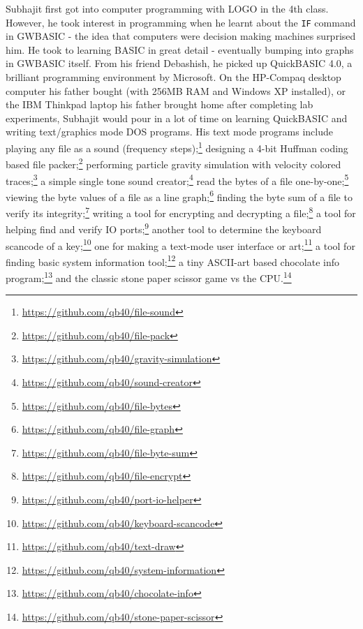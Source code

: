 Subhajit first got into computer programming with LOGO in the 4th class. However, he took interest in programming when he learnt about the \verb|IF| command in GWBASIC - the idea that computers were decision making machines surprised him. He took to learning BASIC in great detail - eventually bumping into graphs in GWBASIC itself. From his friend Debashish, he picked up QuickBASIC 4.0, a brilliant programming environment by Microsoft. On the HP-Compaq desktop computer his father bought (with 256MB RAM and Windows XP installed), or the IBM Thinkpad laptop his father brought home after completing lab experiments, Subhajit would pour in a lot of time on learning QuickBASIC and writing text/graphics mode DOS programs. His text mode programs include playing any file as a sound (frequency steps);\footnote{\url{https://github.com/qb40/file-sound}} designing a 4-bit Huffman coding based file packer;\footnote{\url{https://github.com/qb40/file-pack}} performing particle gravity simulation with velocity colored traces;\footnote{\url{https://github.com/qb40/gravity-simulation}} a simple single tone sound creator;\footnote{\url{https://github.com/qb40/sound-creator}} read the bytes of a file one-by-one;\footnote{\url{https://github.com/qb40/file-bytes}} viewing the byte values of a file as a line graph;\footnote{\url{https://github.com/qb40/file-graph}} finding the byte sum of a file to verify its integrity;\footnote{\url{https://github.com/qb40/file-byte-sum}} writing a tool for encrypting and decrypting a file;\footnote{\url{https://github.com/qb40/file-encrypt}} a tool for helping find and verify IO ports;\footnote{\url{https://github.com/qb40/port-io-helper}} another tool to determine the keyboard scancode of a key;\footnote{\url{https://github.com/qb40/keyboard-scancode}} one for making a text-mode user interface or art;\footnote{\url{https://github.com/qb40/text-draw}} a tool for finding basic system information tool;\footnote{\url{https://github.com/qb40/system-information}} a tiny ASCII-art based chocolate info program;\footnote{\url{https://github.com/qb40/chocolate-info}} and the classic stone paper scissor game vs the CPU.\footnote{\url{https://github.com/qb40/stone-paper-scissor}}

